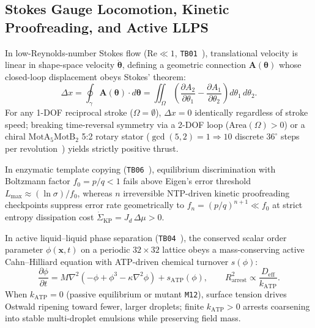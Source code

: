 \documentclass[11pt,reqno]{amsart}
\begin{document}
\subsection{Stokes Gauge Locomotion, Kinetic Proofreading, and Active LLPS}
In low-Reynolds-number Stokes flow ($\mathrm{Re} \ll 1$, \texttt{TB01}~\cite{purcell1977life}), translational velocity is linear in shape-space velocity $\dot{\boldsymbol{\theta}}$, defining a geometric connection $\mathbf{A}(\boldsymbol{\theta})$ whose closed-loop displacement obeys Stokes' theorem:
\begin{equation}
  \Delta x = \oint_{\gamma} \mathbf{A}(\boldsymbol{\theta})\cdot d\boldsymbol{\theta}
  = \iint_{\Omega} \left(\frac{\partial A_2}{\partial \theta_1} - \frac{\partial A_1}{\partial \theta_2}\right) d\theta_1\,d\theta_2.
  \label{eq:purcell}
\end{equation}
For any 1-DOF reciprocal stroke ($\Omega = \emptyset$), $\Delta x = 0$ identically regardless of stroke speed; breaking time-reversal symmetry via a 2-DOF loop ($\mathrm{Area}(\Omega) > 0$) or a chiral $\mathrm{MotA}_5\mathrm{MotB}_2$ 5:2 rotary stator ($\gcd(5,2)=1 \Rightarrow 10$ discrete $36^\circ$ steps per revolution~\cite{santiveri2020structure}) yields strictly positive thrust.

In enzymatic template copying (\texttt{TB06}~\cite{eigen1971selforganization,hopfield1974kinetic,ninio1975kinetic}), equilibrium discrimination with Boltzmann factor $f_0 = p/q < 1$ fails above Eigen's error threshold $L_{\max} \approx (\ln \sigma)/f_0$, whereas $n$ irreversible NTP-driven kinetic proofreading checkpoints suppress error rate geometrically to $f_n = (p/q)^{n+1} \ll f_0$ at strict entropy dissipation cost $\dot{\Sigma}_{\mathrm{KP}} = J_d\,\Delta\mu > 0$.

In active liquid--liquid phase separation (\texttt{TB04}~\cite{zwicker2015suppression}), the conserved scalar order parameter $\phi(\mathbf{x},t)$ on a periodic $32\times 32$ lattice obeys a mass-conserving active Cahn--Hilliard equation with ATP-driven chemical turnover $s(\phi)$:
\begin{equation}
  \frac{\partial \phi}{\partial t} = M \nabla^2 \!\left(-\phi + \phi^3 - \kappa \nabla^2 \phi\right) + s_{\mathrm{ATP}}(\phi),
  \qquad R_{\mathrm{arrest}}^2 \propto \frac{D_{\mathrm{eff}}}{k_{\mathrm{ATP}}}.
  \label{eq:llps}
\end{equation}
When $k_{\mathrm{ATP}} = 0$ (passive equilibrium or mutant \texttt{M12}), surface tension drives Ostwald ripening toward fewer, larger droplets; finite $k_{\mathrm{ATP}} > 0$ arrests coarsening into stable multi-droplet emulsions while preserving field mass.
\end{document}
